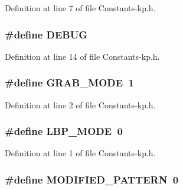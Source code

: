 Definition at line 7 of file Constants-\/kp.\-h.

\hypertarget{_constants-kp_8h_ad72dbcf6d0153db1b8d8a58001feed83}{
\subsubsection[{D\-E\-B\-U\-G}]{\setlength{\rightskip}{0pt plus 5cm}\#define D\-E\-B\-U\-G}}\label{_constants-kp_8h_ad72dbcf6d0153db1b8d8a58001feed83}


Definition at line 14 of file Constants-\/kp.\-h.

\hypertarget{_constants-kp_8h_a66425a38b0c7937c73f50847524a3595}{
\subsubsection[{G\-R\-A\-B\-\_\-\-M\-O\-D\-E}]{\setlength{\rightskip}{0pt plus 5cm}\#define G\-R\-A\-B\-\_\-\-M\-O\-D\-E~1}}\label{_constants-kp_8h_a66425a38b0c7937c73f50847524a3595}


Definition at line 2 of file Constants-\/kp.\-h.

\hypertarget{_constants-kp_8h_a6b33b99442f7c7d9e94f003528a86501}{
\subsubsection[{L\-B\-P\-\_\-\-M\-O\-D\-E}]{\setlength{\rightskip}{0pt plus 5cm}\#define L\-B\-P\-\_\-\-M\-O\-D\-E~0}}\label{_constants-kp_8h_a6b33b99442f7c7d9e94f003528a86501}


Definition at line 1 of file Constants-\/kp.\-h.

\hypertarget{_constants-kp_8h_a3d2cac756a32f6fc8a16ea6bf5f7fa64}{
\subsubsection[{M\-O\-D\-I\-F\-I\-E\-D\-\_\-\-P\-A\-T\-T\-E\-R\-N}]{\setlength{\rightskip}{0pt plus 5cm}\#define M\-O\-D\-I\-F\-I\-E\-D\-\_\-\-P\-A\-T\-T\-E\-R\-N~0}}\label{_constants-kp_8h_a3d2cac756a32f6fc8a16ea6bf5f7fa64}



